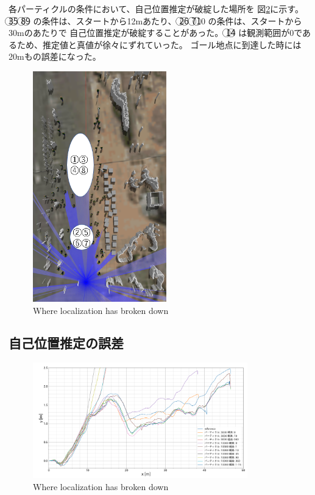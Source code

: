 \documentclass{jarticle}
\begin{document}
各パーティクルの条件において、自己位置推定が破綻した場所を
図\ref{fig: 失敗箇所}に示す。
\textcircled{\scriptsize 3}\textcircled{\scriptsize 5}\noindent
\textcircled{\scriptsize 8}\textcircled{\scriptsize 9}\noindent
の条件は、スタートから12mあたり、
\textcircled{\scriptsize 2}\textcircled{\scriptsize 6}\noindent
\textcircled{\scriptsize 7}\textcircled{\scriptsize 10}\noindent
の条件は、スタートから30mのあたりで
自己位置推定が破綻することがあった。
\textcircled{\scriptsize 1}\textcircled{\scriptsize 4}\noindent
は観測範囲が0であるため、推定値と真値が徐々にずれていった。
ゴール地点に到達した時には20mもの誤差になった。

\begin{figure}[htbp]
  \centering
   \includegraphics[height=100mm]{fig/failure_location.png}
   \vspace*{-4mm}
   \caption{Where localization has broken down}
   \label{fig: 失敗箇所}
\end{figure}

\subsection{自己位置推定の誤差}

\begin{figure}[htbp]
  \centering
   \includegraphics[height=50mm]{fig/x_y.png}
   \vspace*{-4mm}
   \caption{Where localization has broken down}
   \label{fig: 失敗箇所}
\end{figure}
\end{document}
